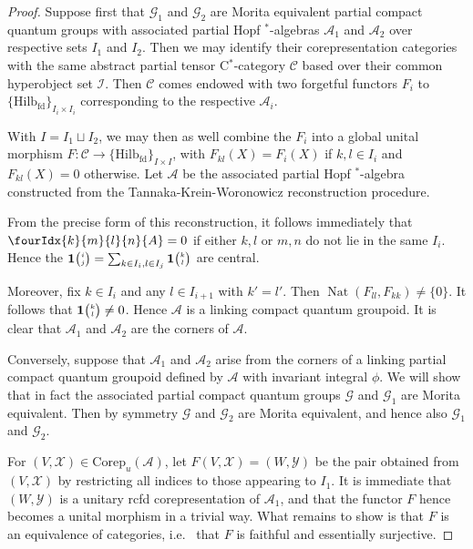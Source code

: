 \documentclass[10pt]{article}
\DeclareMathOperator{\fin}{\mathrm{fd}}
\DeclareMathOperator{\Nat}{\mathrm{Nat}}
\newcommand{\Corep}{\mathrm{Corep}}
\newcommand{\CatCC}{\mathscr{C}}
\newcommand{\Hilb}{\mathrm{Hilb}}
\newcommand{\Grt}[3]{#1{\tiny {\begin{pmatrix} #2\\#3\end{pmatrix}}}}
\newcommand{\UnitC}[2]{\Grt{\mathbf{1}}{#1}{#2}}
\newcommand{\Gr}[5]{\fourIdx{#2}{#4}{#3}{#5}{#1}}%
\theoremstyle{definition}
\numberwithin{equation}{section}
\begin{document}
\begin{proof} Suppose first that $\mathscr{G}_1$ and $\mathscr{G}_2$ are Morita equivalent partial compact quantum groups with associated partial Hopf $^*$-algebras $\mathscr{A}_1$ and $\mathscr{A}_2$ over respective sets $I_1$ and $I_2$. Then we may identify their corepresentation categories with the same abstract partial tensor C$^*$-category $\CatCC$ based over their common hyperobject set $\mathscr{I}$. Then $\CatCC$ comes endowed with two forgetful functors $F_i$ to $\{\Hilb_{\fin}\}_{I_i\times I_i}$ corresponding to the respective $\mathscr{A}_i$.

With $I = I_1\sqcup I_2$, we may then as well combine the $F_i$ into a global unital morphism $F:\CatCC \rightarrow \{\Hilb_{\fin}\}_{I\times I}$, with $F_{kl}(X)=F_i(X)$ if $k,l\in I_i$ and $F_{kl}(X)=0$ otherwise. Let $\mathscr{A}$ be the associated partial Hopf $^*$-algebra constructed from the Tannaka-Krein-Woronowicz reconstruction procedure. 

From the precise form of this reconstruction, it follows immediately that $\Gr{A}{k}{l}{m}{n} =0$ if either $k,l$ or $m,n$ do not lie in the same $I_i$. Hence the $\UnitC{i}{j} = \sum_{k\in I_i,l\in I_j} \UnitC{k}{l}$ are central. 

Moreover, fix $k\in I_i$ and any $l\in I_{i+1}$ with $k'=l'$. Then $\Nat(F_{ll},F_{kk})\neq \{0\}$. It follows that $\UnitC{k}{l}\neq 0$. Hence $\mathscr{A}$ is a linking compact quantum groupoid. It is clear that $\mathscr{A}_1$ and $\mathscr{A}_2$ are the corners of $\mathscr{A}$. 

Conversely, suppose that $\mathscr{A}_1$ and $\mathscr{A}_2$ arise from the corners of a linking partial compact quantum groupoid defined by $\mathscr{A}$ with invariant integral $\phi$. We will show that in fact the associated partial compact quantum groups $\mathscr{G}$ and $\mathscr{G}_1$ are Morita equivalent. Then by symmetry $\mathscr{G}$ and $\mathscr{G}_2$ are Morita equivalent, and hence also $\mathscr{G}_1$ and $\mathscr{G}_2$.

For $(V,\mathscr{X}) \in \Corep_u(\mathscr{A})$, let $F(V,\mathscr{X}) = (W,\mathscr{Y})$ be the pair obtained from $(V,\mathscr{X})$ by restricting all indices to those appearing to $I_1$. It is immediate that $(W,\mathscr{Y})$ is a unitary rcfd corepresentation of $\mathscr{A}_1$, and that the functor $F$ hence becomes a unital morphism in a trivial way. What remains to show is that $F$ is an equivalence of categories, i.e.~ that $F$ is faithful and essentially surjective. 


\end{proof}
\end{document}
